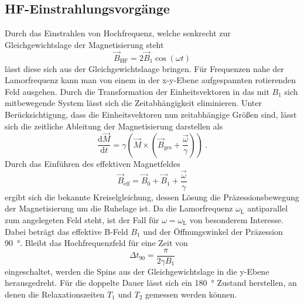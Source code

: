 \subsection{HF-Einstrahlungsvorgänge}%
\label{sub:hf_einstrahlungsvorgaenge}
Durch das Einstrahlen von Hochfrequenz, welche senkrecht zur Gleichgewichtslage
der Magnetisierung steht 
\begin{equation}
		\label{eq:bhf}
		\vec{B}_\text{HF} = 2 \vec{B}_1 \cos(\omega t)
\end{equation}
lässt diese sich aus der Gleichgewichtslaage bringen. 
Für Frequenzen nahe der Lamorfrequenz kann man von einem in der x-y-Ebene
aufgespannten rotierenden Feld ausgehen. 
Durch die Transformation der Einheitsvektoren in das mit $B_1$ sich mitbewegende
System lässt sich die Zeitabhängigkeit eliminieren. 
Unter Berücksichtigung, dass die Einheitsvektoren nun zeitabhängige Größen sind,
lässt sich die zeitliche Ableitung der Magnetisierung darstellen als 
\begin{equation}
		\label{eq:moment}
		\frac{\text{d}\vec{M}}{\text{d} t} = \gamma \left( \vec{M} \times \left(
		\vec{B}_\text{ges} + \frac{\vec{\omega}}{\gamma} \right) \right) \ .
\end{equation}
Durch das Einführen des effektiven Magnetfeldes 
\begin{equation}
		\label{eq:sumB}
		\vec{B}_\text{eff} = \vec{B}_0 + \vec{B}_1 + \frac{\vec{\omega}}{\gamma}
\end{equation}
ergibt sich die bekannte Kreiselgleichung, dessen Lösung die
Präzessionsbewegung der Magnetisierung um die Ruhelage ist. 
Da die Lamorfrequenz $\omega_\text{L}$ antiparallel zum angelegeten Feld steht,
ist der Fall für $\omega = \omega_\text{L}$ von besonderem Interesse.
Dabei beträgt das effektive B-Feld $B_1$ und der Öffnungswinkel der
Präzession \SI{90}{\degree}. 
Bleibt das Hochfrequenzfeld für eine Zeit von 
\begin{equation}
		\label{eq:90kick}
		\Delta t_{90} = \frac{\pi}{2 \gamma B_1}
\end{equation}
eingeschaltet, werden die Spins aus der Gleichgewichtslage in die y-Ebene
herausgedreht. 
Für die doppelte Dauer lässt sich ein \SI{180}{\degree} Zustand herstellen, an denen die
Relaxationszeiten $T_1$ und $T_2$ gemessen werden können. 

